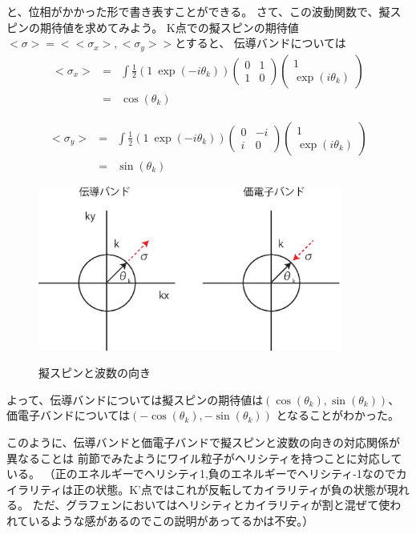 \documentclass{article}
\begin{document}
と、位相がかかった形で書き表すことができる。
さて、この波動関数で、擬スピンの期待値を求めてみよう。
K点での擬スピンの期待値
$<\sigma>=<<\sigma_x>, <\sigma_y>>$とすると、
伝導バンドについては
\begin{eqnarray}
<\sigma_x>&=&\int \frac{1}{2} (1 \:  \exp(-i\theta_k)) 
\left( 
 \begin{array}{cc}
	0 & 1  \\
	1 & 0
 \end{array}
 \right)
  \left( 
 \begin{array}{c}
	1  \\
	\exp(i\theta_k)
 \end{array}
\right)  \\
 &=& \cos(\theta_k)
\end{eqnarray}

\begin{eqnarray}
<\sigma_y>&=&\int \frac{1}{2} (1 \:  \exp(-i\theta_k)) 
\left( 
 \begin{array}{cc}
	0 & -i  \\
	i & 0
 \end{array}
 \right)
  \left( 
 \begin{array}{c}
	1  \\
	\exp(i\theta_k)
 \end{array}
\right)  \\
 &=& \sin(\theta_k)
\end{eqnarray}


\begin{figure}[hbtp]
\centering
\includegraphics[width=10cm]{psuedoSpin.eps}
\label{pseudo}
\caption{擬スピンと波数の向き}
\end{figure}

よって、伝導バンドについては擬スピンの期待値は$(\cos(\theta_k),\sin(\theta_k))$、
価電子バンドについては$(-\cos(\theta_k),-\sin(\theta_k))$
となることがわかった。

このように、伝導バンドと価電子バンドで擬スピンと波数の向きの対応関係が異なることは
前節でみたようにワイル粒子がヘリシティを持つことに対応している。
（正のエネルギーでヘリシティ1,負のエネルギーでヘリシティ-1なのでカイラリティは正の状態。K'点ではこれが反転してカイラリティが負の状態が現れる。
ただ、グラフェンにおいてはヘリシティとカイラリティが割と混ぜて使われているような感があるのでこの説明があってるかは不安。）
\end{document}

